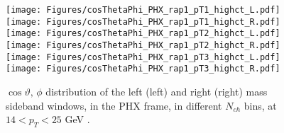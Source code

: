 \documentclass[12pt]{article}
\newcommand{\pt}{$p_{\mathrm{T}}$}
\begin{document}
%
%
%

\begin{figure}[htbp]
\centering
\texttt{[image: Figures/cosThetaPhi\_PHX\_rap1\_pT1\_highct\_L.pdf]}
\texttt{[image: Figures/cosThetaPhi\_PHX\_rap1\_pT1\_highct\_R.pdf]}
\texttt{[image: Figures/cosThetaPhi\_PHX\_rap1\_pT2\_highct\_L.pdf]}
\texttt{[image: Figures/cosThetaPhi\_PHX\_rap1\_pT2\_highct\_R.pdf]}
\texttt{[image: Figures/cosThetaPhi\_PHX\_rap1\_pT3\_highct\_L.pdf]}
\texttt{[image: Figures/cosThetaPhi\_PHX\_rap1\_pT3\_highct\_R.pdf]}
\caption{$\cos\vartheta,\,\phi$ distribution of the left (left) and
  right (right) mass sideband windows, in the PHX frame, in different
  $N_{ch}$ bins, at $14 < p_{T} < 25$ GeV .}
\end{figure}
\clearpage
\end{document}

